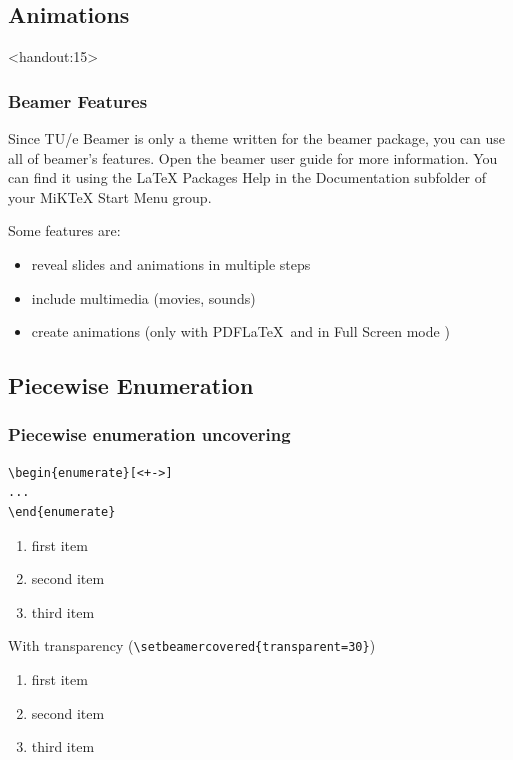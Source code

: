 \documentclass[t]{beamer}
\begin{document}
\subsection{Animations}
\begin{frame}<handout:15>  %

\frametitle{Beamer Features}

Since TU/e Beamer is only a theme written for the {\sf beamer} package, you can use all of {\sf beamer}'s features. Open the beamer user guide for more information. You can find it using the LaTeX Packages Help in the Documentation subfolder of your MiKTeX Start Menu group.

\bigskip
Some features are:
\begin{itemize}
\pause\item reveal slides and animations in multiple steps
\pause\item include multimedia (movies, sounds)
\pause\item\hspace{\vsp}create animations (only with PDF\LaTeX\ and in Full Screen mode )
\end{itemize}
\end{frame}

\subsection{Piecewise Enumeration}
\begin{frame}[fragile]
\frametitle{Piecewise enumeration uncovering}

\begin{lstlisting}
\begin{enumerate}[<+->]
...
\end{enumerate}
\end{lstlisting}

\begin{enumerate}[<+->]
\item first item
\item second item
\item third item
\end{enumerate}
\pause
With transparency (\lstinline|\setbeamercovered{transparent=30}|)
\begin{enumerate}[<+->]
\item first item
\item second item
\item third item
\end{enumerate}

\end{frame}
\end{document}
